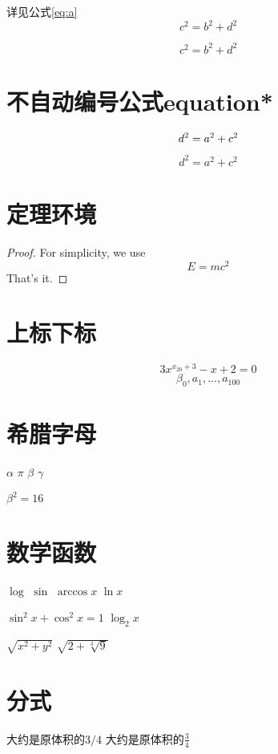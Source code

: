 \documentclass{article}
\begin{document}
    详见公式\ref{eq:a}
    \begin{equation} 
    c^2 = b ^2 + d^2 \label{eq:a}
    \end{equation}

    \begin{equation} 
     c^2 = b ^2 + d^2 \tag{*} 
    \end{equation}

\section{不自动编号公式equation*}  
    \begin{equation}
    d^2 = a ^2 + c^2 \notag
    \end{equation}
    
    \begin{equation*}
    d^2 = a ^2 + c^2 
    \end{equation*}

\section{定理环境}
    \begin{proof}
    For simplicity, we use
    \[
    E=mc^2
    \]
    That's it.
    \end{proof}

\section{上标下标}
    $$3x^{x_{20} + 3} - x + 2 = 0$$
    $$\beta_0,a_1,...,a_{100}$$

\section{希腊字母} 
    $\alpha$
    $\pi$
    $\beta$
    $\gamma$

    $\beta^2 = 16$

\section{数学函数}
    $\log$
    $\sin$
    $\arccos x$
    $\ln x$

    $\sin^2 x+\cos^2 x = 1$
    $\log_2 x$

    $\sqrt{x ^ 2 + y ^ 2}$
    $\sqrt{2 + \sqrt[3]{9}}$ %

\section{分式}
    大约是原体积的$3/4$
    大约是原体积的$\frac{3}{4}$
\end{document}
